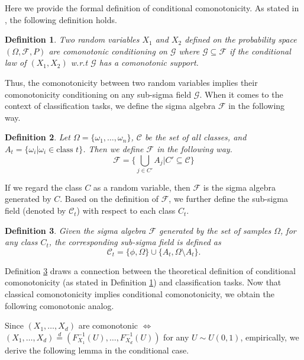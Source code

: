 \documentclass[twoside,11pt]{article}
\newtheorem{definition}{Definition}[subsection]
\begin{document}
Here we provide the formal definition of conditional comonotonicity. As stated in \citet{jouini2004conditional}, the following definition holds.
\begin{definition}
Two random variables $X_1$ and $X_2$ defined on the probability space $(\Omega, \mathcal{F}, P)$ are comonotonic conditioning on $\mathcal{G}$ where $\mathcal{G}\subseteq\mathcal{F}$ if the conditional law of $(X_1,X_2)$ w.r.t $\mathcal{G}$ has a comonotonic support.
\label{cond_como}
\end{definition}
Thus, the comonotonicity between two random variables implies their comonotonicity conditioning on any sub-sigma field $\mathcal{G}$. When it comes to the context of classification tasks, we define the sigma algebra $\mathcal{F}$ in the following way.
\begin{definition}
Let $\Omega=\{\omega_1,\dots,\omega_n\}$, $\mathcal{C}$ be the set of all classes, and $A_t = \{\omega_i|\omega_i\in\text{class }t\}$. Then we define $\mathcal{F}$ in the following way.
\begin{equation*}
\mathcal{F}=\{\bigcup_{j\in C'}A_j|C'\subseteq \mathcal{C}\}
\end{equation*}
\end{definition}
If we regard the class $C$ as a random variable, then $\mathcal{F}$ is the sigma algebra generated by $C$. Based on the definition of $\mathcal{F}$, we further define the sub-sigma field (denoted by $\mathcal{C}_t$) with respect to each class $C_t$.
\begin{definition}
Given the sigma algebra $\mathcal{F}$ generated by the set of samples $\Omega$, for any class $C_t$, the corresponding sub-sigma field is defined as
\begin{equation*}
\mathcal{C}_t=\{\phi,\Omega\}\cup\{A_t,\Omega\setminus A_t\}.
\end{equation*}
\label{sub_sigma_field}
\end{definition}

Definition \ref{sub_sigma_field} draws a connection between the theoretical definition of conditional comonotonicity (as stated in Definition \ref{cond_como}) and classification tasks. Now that classical comonotonicity implies conditional comonotonicity, we obtain the following comonotonic analog.

Since $(X_1,\dots,X_d)$ are comonotonic $\Leftrightarrow$ $(X_1,\dots,X_d)\stackrel{d}{=}(F_{X_1}^{-1}(U),\dots,F_{X_d}^{-1}(U))$ for any $U\sim U(0,1)$, empirically, we derive the following lemma in the conditional case.
\end{document}
